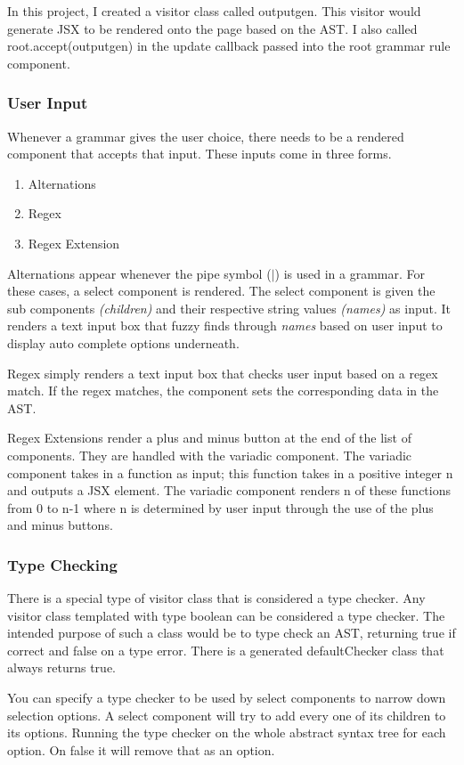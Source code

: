 \documentclass[hidelinks,12pt]{article}
\begin{document}
\begin{doublespacing}
In this project, I created a visitor class called outputgen. This visitor would generate JSX to be rendered onto the page based on the AST. I also called root.accept(outputgen) in the update callback passed into the root grammar rule component.
\subsubsection*{User Input}
Whenever a grammar gives the user choice, there needs to be a rendered component that accepts that input. These inputs come in three forms.
\begin{enumerate}
    \item Alternations
    \item Regex
    \item Regex Extension
\end{enumerate}
Alternations appear whenever the pipe symbol ($|$) is used in a grammar. For these cases, a select component is rendered. The select component is given the sub components \textit{(children)} and their respective string values \textit{(names)} as input. It renders a text input box that fuzzy finds through \textit{names} based on user input to display auto complete options underneath. 

Regex simply renders a text input box that checks user input based on a regex match. If the regex matches, the component sets the corresponding data in the AST.

Regex Extensions render a plus and minus button at the end of the list of components. They are handled with the variadic component. The variadic component takes in a function as input; this function takes in a positive integer n and outputs a JSX element. The variadic component renders n of these functions from 0 to n-1 where n is determined by user input through the use of the plus and minus buttons.
\subsubsection*{Type Checking}
There is a special type of visitor class that is considered a type checker. Any visitor class templated with type boolean can be considered a type checker. The intended purpose of such a class would be to type check an AST, returning true if correct and false on a type error. There is a generated defaultChecker class that always returns true.

You can specify a type checker to be used by select components to narrow down selection options. A select component will try to add every one of its children to its options. Running the type checker on the whole abstract syntax tree for each option. On false it will remove that as an option.

\end{doublespacing}
\end{document}
